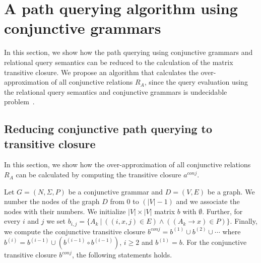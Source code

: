 \section{A path querying algorithm using conjunctive grammars}  \label{section_main}
In this section, we show how the path querying using conjunctive grammars and relational query semantics can be reduced to the calculation of the matrix transitive closure. We propose an algorithm that calculates the over-approximation of all conjunctive relations $R_A$, since the query evaluation using the relational query semantics and conjunctive grammars is undecidable problem~\cite{hellingsRelational}.

\subsection{Reducing conjunctive path querying to transitive closure} \label{section_reducing_conj}
In this section, we show how the over-approximation of all conjunctive relations $R_A$ can be calculated by computing the transitive closure $a^{conj}$.

Let $G = (N,\Sigma,P)$ be a conjunctive grammar and $D = (V, E)$ be a graph. We number the nodes of the graph $D$ from 0 to $(|V| - 1)$ and we associate the nodes with their numbers. We initialize $|V| \times |V|$ matrix $b$ with $\emptyset$. Further, for every $i$ and $j$ we set $b_{i,j} = \{A_k~|~((i,x,j) \in E) \wedge ((A_k \rightarrow x) \in P)\}$. Finally, we compute the conjunctive transitive closure $b^{conj} = b^{(1)} \cup b^{(2)} \cup \cdots$ where $b^{(i)} = b^{(i-1)} \cup (b^{(i-1)} \circ b^{(i-1)})$, $i \ge 2$ and $b^{(1)} = b$. For the conjunctive transitive closure $b^{conj}$, the following statements holds.

